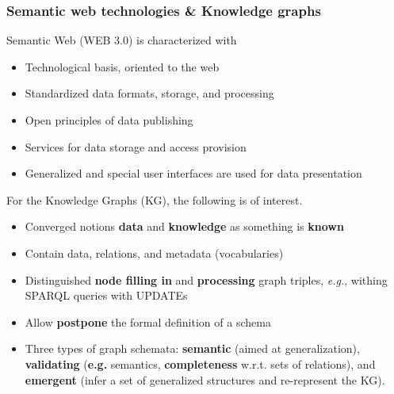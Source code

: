 \documentclass[10pt]{beamer}
\begin{document}
\begin{frame}[fragile]
  \frametitle{Semantic web technologies \& Knowledge graphs}
  Semantic Web (WEB 3.0) is characterized with
  \begin{itemize}
  \item Technological basis, oriented to the web %
  \item Standardized data formats, storage, and processing
  \item Open principles of data publishing
  \item Services for data storage and access provision
  \item Generalized and special user interfaces are used for data presentation\vspace{1em}
  \end{itemize}


For the Knowledge Graphs (KG), the following is of interest.
 \begin{itemize}
  \item Converged notions \textbf{data} and \textbf{knowledge} as something is \textbf{known}
  \item Contain data, relations, and metadata (vocabularies)
  \item Distinguished \textbf{node filling in} and \textbf{processing} graph triples, \emph{e.g.}, withing SPARQL queries with UPDATEs
  \item Allow \textbf{postpone} the formal definition of a schema
  \item Three types of graph schemata: \textbf{semantic} (aimed at generalization), \textbf{validating} (\textbf{e.g.} semantics, \textbf{completeness} w.r.t. sets of relations), and \textbf{emergent} (infer a set of generalized structures and re-represent the KG).
  \end{itemize}
\end{frame}
\end{document}
